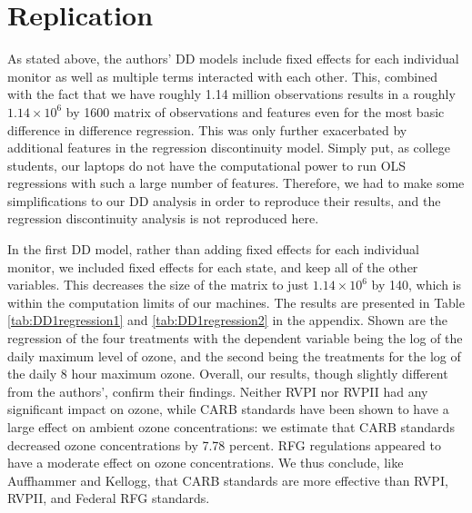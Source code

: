 \documentclass{article}
\begin{document}
\section{Replication}

As stated above, the authors' DD models include fixed effects for each individual monitor as well as multiple terms interacted with each other. This, combined with the fact that we have roughly 1.14 million observations results in a roughly $1.14 \times 10^6$ by 1600 matrix of observations and features even for the most basic difference in difference regression. This was only further exacerbated by additional features in the regression discontinuity model. Simply put, as college students, our laptops do not have the computational power to run OLS regressions with such a large number of features. Therefore, we had to make some simplifications to our DD analysis in order to reproduce their results, and the regression discontinuity analysis is not reproduced here. 

In the first DD model, rather than adding fixed effects for each individual monitor, we included fixed effects for each state, and keep all of the other variables. This decreases the size of the matrix to just $1.14 \times 10^6$ by 140, which is within the computation limits of our machines. The results are presented in Table \ref{tab:DD1regression1} and \ref{tab:DD1regression2} in the appendix. Shown are the regression of the four treatments with the dependent variable being the log of the daily maximum level of ozone, and the second being the treatments for the log of the daily 8 hour maximum ozone. Overall, our results, though slightly different from the authors', confirm their findings. Neither RVPI nor RVPII had any significant impact on ozone, while CARB standards have been shown to have a large effect on ambient ozone concentrations: we estimate that CARB standards decreased ozone concentrations by 7.78 percent. RFG regulations appeared to have a moderate effect on ozone concentrations. We thus conclude, like Auffhammer and Kellogg, that CARB standards are more effective than RVPI, RVPII, and Federal RFG standards.   
 
\end{document}
